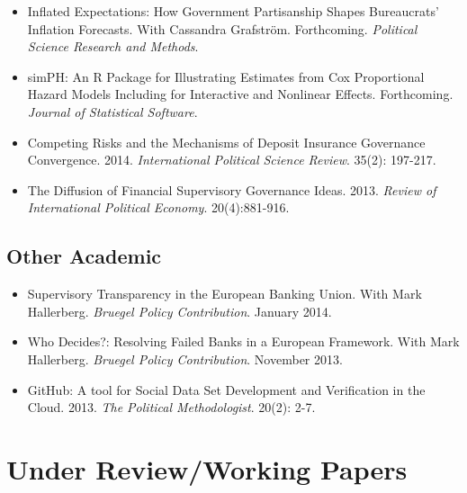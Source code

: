 \documentclass[a4paper]{article}
\begin{document}
{{\begin{itemize}

    \item Inflated Expectations: How Government Partisanship Shapes Bureaucrats' Inflation Forecasts. With Cassandra Grafstr\"{o}m. Forthcoming. {\emph{Political Science Research and Methods}}.

    \item simPH: An R Package for Illustrating Estimates from Cox Proportional Hazard Models Including for Interactive and Nonlinear Effects. Forthcoming. {\emph{Journal of Statistical Software}}.

    \item Competing Risks and the Mechanisms of Deposit Insurance Governance Convergence. 2014. {\emph{International Political Science Review}}. 35(2): 197-217.

    \item The Diffusion of Financial Supervisory Governance Ideas. 2013. {\emph{Review of International Political Economy}}. 20(4):881-916.

\end{itemize}

\subsection*{Other Academic}

\begin{itemize}

    \item Supervisory Transparency in the European Banking Union. With Mark Hallerberg. {\emph{Bruegel Policy Contribution}}. January 2014.

    \item Who Decides?: Resolving Failed Banks in a European Framework. With Mark Hallerberg. {\emph{Bruegel Policy Contribution}}. November 2013.

    \item GitHub: A tool for Social Data Set Development and Verification in the Cloud. 2013. {\emph{The Political Methodologist}}. 20(2): 2-7.

\end{itemize}


\section*{Under Review/Working Papers}

\begin{itemize}


\end{itemize}}}
\end{document}
